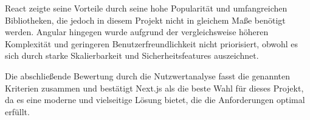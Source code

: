React zeigte seine Vorteile durch seine hohe Popularität und umfangreichen Bibliotheken, die jedoch in diesem Projekt nicht in gleichem Maße benötigt werden. Angular hingegen wurde aufgrund der vergleichsweise höheren Komplexität und geringeren Benutzerfreundlichkeit nicht priorisiert, obwohl es sich durch starke Skalierbarkeit und Sicherheitsfeatures auszeichnet.

Die abschließende Bewertung durch die Nutzwertanalyse fasst die genannten Kriterien zusammen und bestätigt Next.js als die beste Wahl für dieses Projekt, da es eine moderne und vielseitige Lösung bietet, die die Anforderungen optimal erfüllt.
